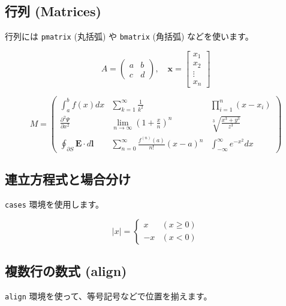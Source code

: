 \documentclass{ltjsarticle}
\theoremstyle{definition}
\begin{document}
\subsection{行列 (Matrices)}
行列には \texttt{pmatrix} (丸括弧) や \texttt{bmatrix} (角括弧) などを使います。

\begin{equation}
  A = \begin{pmatrix}
    a & b \\
    c & d
  \end{pmatrix}, \quad
  \bm{x} = \begin{bmatrix}
    x_1 \\
    x_2 \\
    \vdots \\
    x_n
  \end{bmatrix}
\end{equation}

\begin{equation}
   M = \begin{pmatrix}
    \displaystyle \int_{a}^{b} f(x)dx & \displaystyle \sum_{k=1}^{\infty} \frac{1}{k^2} & \displaystyle \prod_{i=1}^{n} (x - x_i) \\
    \displaystyle \frac{\partial^2 \Psi}{\partial x^2} & \displaystyle \lim_{n \to \infty} \left( 1 + \frac{x}{n} \right)^n & \displaystyle \sqrt[3]{\frac{x^3 + y^3}{z^3}} \\
    \displaystyle \oint_{\partial S} \mathbf{E} \cdot d\mathbf{l} & \displaystyle \sum_{n=0}^{\infty} \frac{f^{(n)}(a)}{n!} (x-a)^n & \displaystyle \int_{-\infty}^{\infty} e^{-x^2} dx
   \end{pmatrix}
\end{equation}

\subsection{連立方程式と場合分け}
\texttt{cases} 環境を使用します。

\begin{equation}
  |x| = \begin{cases}
    x & (x \ge 0) \\
    -x & (x < 0)
  \end{cases}
\end{equation}

\subsection{複数行の数式 (align)}
\texttt{align} 環境を使って、等号記号などで位置を揃えます。
\end{document}

